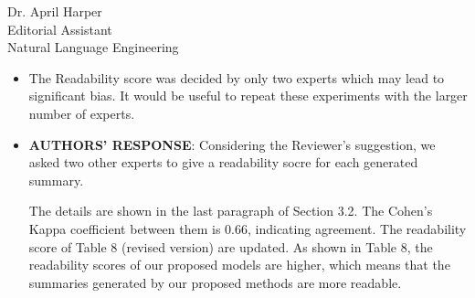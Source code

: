 \documentclass[11pt]{letter} %
\theoremstyle{definition}
\begin{document}
\begin{letter}{Dr. April Harper \\
            Editorial Assistant \\
			Natural Language Engineering}
\begin{enumerate}
\begin{itemize}
                The details are in Section 1 and Section 3.3 as follows:
                \begin{itemize}
                	\item[-] ``Self-attention-based model is 
                	the basis of many recent state-of-the-art systems,
                	which always need multi-layer self-attention 
                	and have greater computational complexity than CNN seq2seq models 
                	(Vaswani et al. 2018).
                	Thus, we take CNN seq2seq models as the target model to improve on and
                	compare with in this paper.'' (Section 1)
                	\item[-] ``The vanilla CNN seq2seq model and vanilla self-attention-based model have the similar
                	feature capture capabilities.
                	With long inputs, the self-attention-based models
                	will have greater computational complexity, such as Transformer. 
                	As the inputs of summarization is very long, the self-attention-based models
                	always need much more time during training and testing.
                	Besides, the self-attention-based models contain more training parameters,
                	which need the memory usage at training and testing time. .'' (Section 3.3)
                \end{itemize}
            
                \item The Readability score was decided by only two experts which may lead to significant bias. It would be useful to repeat these experiments with the larger number of experts.
				\item[] \textbf{AUTHORS' RESPONSE}: 
                Considering the Reviewer's suggestion, we  asked two other experts to give a readability socre for each generated summary.
                
                The details are shown in the last paragraph of Section 3.2. The Cohen’s Kappa coefficient between them is 0.66, indicating  agreement. The readability score of Table 8 (revised version) are updated. As shown in Table 8, the readability scores of our proposed models are higher, which means that the summaries generated by our proposed methods are more readable.

				
			\end{itemize}


\end{enumerate}
\end{letter}
\end{document}
